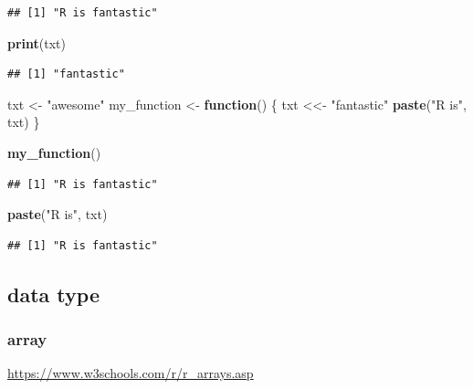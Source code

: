 \documentclass[
]{book}
\newenvironment{Shaded}{\begin{snugshade}}{\end{snugshade}}
\newcommand{\ControlFlowTok}[1]{\textcolor[rgb]{0.13,0.29,0.53}{\textbf{#1}}}
\newcommand{\FunctionTok}[1]{\textcolor[rgb]{0.13,0.29,0.53}{\textbf{#1}}}
\newcommand{\NormalTok}[1]{#1}
\newcommand{\OtherTok}[1]{\textcolor[rgb]{0.56,0.35,0.01}{#1}}
\newcommand{\StringTok}[1]{\textcolor[rgb]{0.31,0.60,0.02}{#1}}
\theoremstyle{definition}
\theoremstyle{definition}
\theoremstyle{definition}
\theoremstyle{definition}
\theoremstyle{remark}
\begin{document}
\begin{verbatim}
## [1] "R is fantastic"
\end{verbatim}

\begin{Shaded}
\begin{Highlighting}[]
\FunctionTok{print}\NormalTok{(txt)}
\end{Highlighting}
\end{Shaded}

\begin{verbatim}
## [1] "fantastic"
\end{verbatim}

\begin{Shaded}
\begin{Highlighting}[]
\NormalTok{txt }\OtherTok{\textless{}{-}} \StringTok{"awesome"}
\NormalTok{my\_function }\OtherTok{\textless{}{-}} \ControlFlowTok{function}\NormalTok{() \{}
\NormalTok{  txt }\OtherTok{\textless{}\textless{}{-}} \StringTok{"fantastic"}
  \FunctionTok{paste}\NormalTok{(}\StringTok{"R is"}\NormalTok{, txt)}
\NormalTok{\}}

\FunctionTok{my\_function}\NormalTok{()}
\end{Highlighting}
\end{Shaded}

\begin{verbatim}
## [1] "R is fantastic"
\end{verbatim}

\begin{Shaded}
\begin{Highlighting}[]
\FunctionTok{paste}\NormalTok{(}\StringTok{"R is"}\NormalTok{, txt)}
\end{Highlighting}
\end{Shaded}

\begin{verbatim}
## [1] "R is fantastic"
\end{verbatim}

\hypertarget{data-type-1}{%
\subsection{data type}\label{data-type-1}}

\hypertarget{array}{%
\subsubsection{array}\label{array}}

\url{https://www.w3schools.com/r/r_arrays.asp}
\end{document}
